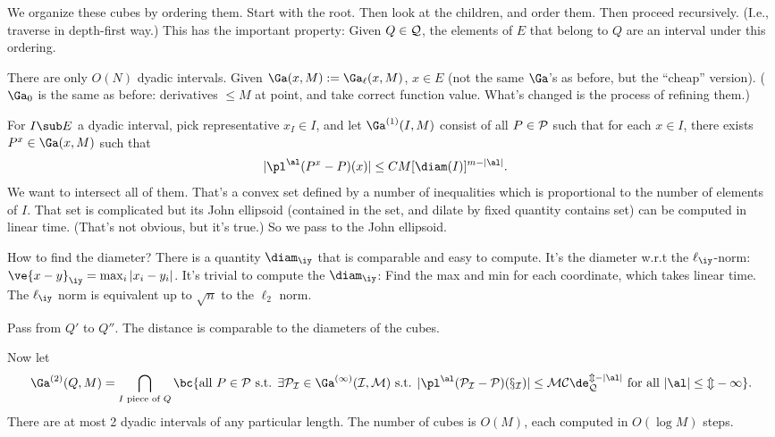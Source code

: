 We organize these cubes by ordering them.
Start with the root. Then look at the children, and order them.  Then proceed recursively. (I.e., traverse in depth-first way.) This has the important property: Given $Q\in \cal Q$, the elements of $E$ that belong to $Q$ are an interval under this ordering.

There are only $O(N)$ dyadic intervals.
Given $\Ga(x,M):=\Ga_\ell(x,M)$, $x\in E$ (not the same $\Ga$'s as before, but the ``cheap'' version). ($\Ga_0$ is the same as before: derivatives $\le M$ at point, and take correct function value. What's changed is the process of refining them.)

For $I\sub E$ a dyadic interval, pick representative $x_I\in I$, and let
$
\Ga^{(1)} (I,M) 
$
consist of all $P\in \cal P$ such that for each $x\in I$, there exists $P^x\in \Ga(x,M)$ such that 
\begin{align}
|\pl^\al (P^x-P)(x)|
&\le CM [\diam(I)]^{m-|\al|}.
\end{align}
We want to intersect all of them. That's a convex set defined by a number of inequalities which is proportional to the number of elements of $I$. That set is complicated but its John ellipsoid (contained in the set, and dilate by fixed quantity contains set) can be computed in linear time. (That's not obvious, but it's true.) So we pass to the John ellipsoid.

How to find the diameter? There is a quantity $\diam_\iy$ that is comparable and easy to compute. It's the diameter w.r.t the $\ell_\iy$-norm: $\ve{x-y}_\iy = \max_i |x_i-y_i|$. It's  trivial to compute the $\diam_\iy$: %
Find the max and min for each coordinate, which takes linear time.
The $\ell_\iy$ norm is equivalent up to $\sqrt n$  to the $\ell_2$ norm. 

Pass from $Q'$ to $Q''$. The distance is comparable to the diameters of the cubes. %

Now let 
\begin{align}\Ga^{(2)}(Q,M) = \bigcap_{I\text{ piece of }Q}\bc{\text{all }P\in \cal P \text{ s.t. }\exists P_I\in \Ga^{(1)}(I,M)\text{ s.t. }|\pl^\al(P_I-P)(x_I)|\le MC\de_Q^{m-|\al|}\text{ for all }|\al|\le m-1
}.
\end{align}
There are at most 2 dyadic intervals of any particular length. %
The number of cubes is $O(M)$, each computed in $O(\log M)$ steps. 

